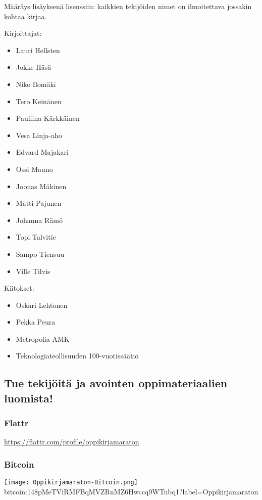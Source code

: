 Määräys lisäyksenä lisenssiin: kaikkien tekijöiden nimet on ilmoitettava jossakin kohtaa kirjaa.

\newpage

\begin{minipage}[t]{0.4\textwidth}
Kirjoittajat:
\begin{itemize}
\item Lauri Hellsten
\item Jokke Häsä
\item Niko Ilomäki
\item Tero Keinänen
\item Pauliina Kärkkäinen
\item Vesa Linja-aho
\item Edvard Majakari
\item Ossi Mauno
\item Joonas Mäkinen
\item Matti Pajunen
\item Johanna Rämö
\item Topi Talvitie
\item Sampo Tiensuu
\item Ville Tilvis
\end{itemize}
\end{minipage}
\begin{minipage}[t]{0.8\textwidth}
Kiitokset:
\begin{itemize}
\item Oskari Lehtonen %
\item Pekka Peura %
\item Metropolia AMK %
\item Teknologiateollisuuden 100-vuotissäätiö %
\end{itemize}
\end{minipage}

\subsection*{Tue tekijöitä ja avointen oppimateriaalien luomista!}

\subsubsection*{Flattr}
\url{https://flattr.com/profile/oppikirjamaraton}



\subsubsection*{Bitcoin}

\texttt{[image: Oppikirjamaraton-Bitcoin.png]} \\
bitcoin:148pMeTViRMFBqMVZRnMZ6Hwccq9WTubq1?label=Oppikirjamaraton
